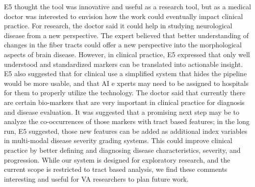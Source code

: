 E5 thought the tool was innovative and useful as a research tool, but as a medical doctor was interested to envision how the work could eventually impact clinical practice. For research, the doctor said it could help in studying neurological disease from a new perspective. The expert believed that better understanding of changes in the fiber tracts could offer a new perspective into the morphological aspects of brain disease. However, in clinical practice, E5 expressed that only well understood and standardized markers can be translated into actionable insight. E5 also suggested that for clinical use a simplified system that hides the  pipeline would be more usable, and that AI e
xperts may need to be assigned to hospitals for them to properly utilize the technology. The doctor said that currently there are certain bio-markers that are very important in clinical practice for diagnosis and disease evaluation. It was suggested that a promising next step may be to analyze the co-occurrences of those markers with tract based features; in the long run, E5 suggested, those new features can be added as additional index variables in multi-modal disease severity grading systems. This could improve clinical practice by better defining and diagnosing disease characteristics, severity, and progression. While our system is designed for exploratory research, and the current scope is restricted to tract based analysis, we find these comments interesting and useful for VA researchers to plan future work. 

